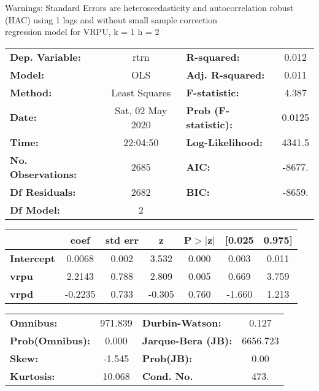 Warnings: \newline
 [1] Standard Errors are heteroscedasticity and autocorrelation robust (HAC) using 1 lags and without small sample correction\\ 

regression model for VRPU, k = 1 h = 2\begin{center}
\begin{tabular}{lclc}
\toprule
\textbf{Dep. Variable:}    &       rtrn       & \textbf{  R-squared:         } &     0.012   \\
\textbf{Model:}            &       OLS        & \textbf{  Adj. R-squared:    } &     0.011   \\
\textbf{Method:}           &  Least Squares   & \textbf{  F-statistic:       } &     4.387   \\
\textbf{Date:}             & Sat, 02 May 2020 & \textbf{  Prob (F-statistic):} &   0.0125    \\
\textbf{Time:}             &     22:04:50     & \textbf{  Log-Likelihood:    } &    4341.5   \\
\textbf{No. Observations:} &        2685      & \textbf{  AIC:               } &    -8677.   \\
\textbf{Df Residuals:}     &        2682      & \textbf{  BIC:               } &    -8659.   \\
\textbf{Df Model:}         &           2      & \textbf{                     } &             \\
\bottomrule
\end{tabular}
\begin{tabular}{lcccccc}
                   & \textbf{coef} & \textbf{std err} & \textbf{z} & \textbf{P$> |$z$|$} & \textbf{[0.025} & \textbf{0.975]}  \\
\midrule
\textbf{Intercept} &       0.0068  &        0.002     &     3.532  &         0.000        &        0.003    &        0.011     \\
\textbf{vrpu}      &       2.2143  &        0.788     &     2.809  &         0.005        &        0.669    &        3.759     \\
\textbf{vrpd}      &      -0.2235  &        0.733     &    -0.305  &         0.760        &       -1.660    &        1.213     \\
\bottomrule
\end{tabular}
\begin{tabular}{lclc}
\textbf{Omnibus:}       & 971.839 & \textbf{  Durbin-Watson:     } &    0.127  \\
\textbf{Prob(Omnibus):} &   0.000 & \textbf{  Jarque-Bera (JB):  } & 6656.723  \\
\textbf{Skew:}          &  -1.545 & \textbf{  Prob(JB):          } &     0.00  \\
\textbf{Kurtosis:}      &  10.068 & \textbf{  Cond. No.          } &     473.  \\
\bottomrule
\end{tabular}
\end{center}

